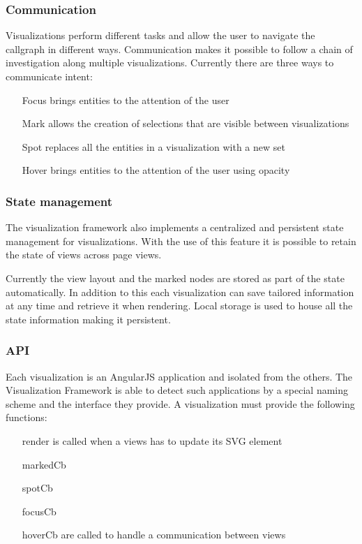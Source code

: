 \subsubsection{Communication}

Visualizations perform different tasks and allow the user to navigate the callgraph in different ways. Communication makes it possible to follow a chain of investigation along multiple visualizations. Currently there are three ways to communicate intent:

\begin{itemize}
	\item[Focus] brings entities to the attention of the user
	\item[Mark] allows the creation of selections that are visible between visualizations
	\item[Spot] replaces all the entities in a visualization with a new set
	\item[Hover] brings entities to the attention of the user using opacity
\end{itemize}

\subsubsection{State management}

The visualization framework also implements a centralized and persistent state management for visualizations. With the use of this feature it is possible to retain the state of views across page views.

Currently the view layout and the marked nodes are stored as part of the state automatically. In addition to this each visualization can save tailored information at any time and retrieve it when rendering. Local storage is used to house all the state information making it persistent.

\subsubsection{API}
Each visualization is an AngularJS application and isolated from the others. The Visualization Framework is able to detect such applications by a special naming scheme and the interface they provide. A visualization must provide the following functions:

\begin{itemize}
	\item[render] is called when a views has to update its SVG element
	\item[markedCb]
	\item[spotCb]
	\item[focusCb]
	\item[hoverCb] are called to handle a communication between views
\end{itemize}